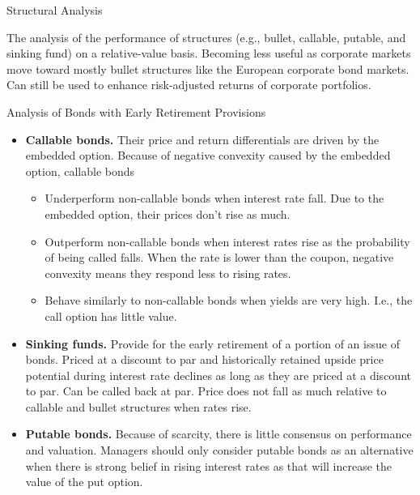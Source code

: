 \documentclass[../custom]{flashcards}
\begin{document}
\begin{flashcard}{Structural Analysis}
    \begin{flushleft}
        The analysis of the performance of structures (e.g., bullet, callable, putable, and sinking fund) on a relative-value basis. Becoming less useful as corporate markets move toward mostly bullet structures like the European corporate bond markets. Can still be used to enhance risk-adjusted returns of corporate portfolios.
    \end{flushleft}
\end{flashcard}

\begin{flashcard}{Analysis of Bonds with Early Retirement Provisions}
    \begin{itemize}
        \item \textbf{Callable bonds.} Their price and return differentials are driven by the embedded option. Because of negative convexity caused by the embedded option, callable bonds
            \begin{itemize}
                \item Underperform non-callable bonds when interest rate fall. Due to the embedded option, their prices don't rise as much.
                \item Outperform non-callable bonds when interest rates rise as the probability of being called falls. When the rate is lower than the coupon, negative convexity means they respond less to rising rates.
                \item Behave similarly to non-callable bonds when yields are very high. I.e., the call option has little value.
            \end{itemize}
        \item \textbf{Sinking funds.} Provide for the early retirement of a portion of an issue of bonds. Priced at a discount to par and historically retained upside price potential during interest rate declines as long as they are priced at a discount to par. Can be called back at par. Price does not fall as much relative to callable and bullet structures when rates rise.
        \item \textbf{Putable bonds.} Because of scarcity, there is little consensus on performance and valuation. Managers should only consider putable bonds as an alternative when there is strong belief in rising interest rates as that will increase the value of the put option.
    \end{itemize}
\end{flashcard}
\end{document}
